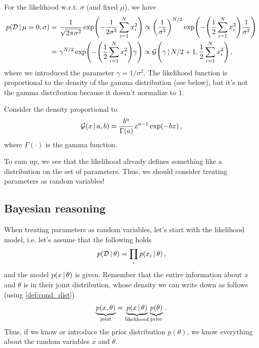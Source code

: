 For the likelihood w.r.t. $\sigma$ (and fixed $\mu$), we have
\begin{align}
    p(\mathcal{D}\cond \mu=0, \sigma) =~& \frac{1}{\sqrt{2\pi\sigma^2}}\exp\left(-\frac{1}{2\sigma^2}\sum_{i=1}^Nx_i^2\right) \propto \left(\frac{1}{\sigma^2}\right)^{N/2}\exp\left(-\left(\frac{1}{2}\sum_{i=1}^Nx_i^2\right)\frac{1}{\sigma^2}\right)\\
    =~& \gamma^{N/2}\exp\left(-\left(\frac{1}{2}\sum_{i=1}^Nx_i^2\right)\gamma\right) \propto \mathcal{G}\left(\gamma\cond N/2+1, \frac{1}{2}\sum_{i=1}^Nx_i^2\right)\,,
\end{align}
where we introduced the parameter $\gamma = 1/\sigma^2$.
The likelihood function is proportional to the density of the gamma distribution (see below), but it's not the gamma distribution because it doesn't normalize to $1$.

\begin{definition}\label{def:gamma_pdf}
    Consider the density proportional to 
    \begin{align}
        \mathcal{G}(x\,|\, a,b) = \frac{b^a}{\Gamma(a)}x^{a-1}\exp(-b x)\,,
    \end{align}
    where $\Gamma(\cdot)$ is the gamma function.
\end{definition}

To sum up, we see that the likelihood already defines something like a distribution on the set of parameters.
Thus, we should consider treating parameters as random variables!

\subsection{Bayesian reasoning}

When treating parameters as random variables, let's start with the likelihood model, i.e. let's assume that the following holds
\begin{align}
    p(\mathcal{D} \,|\, \theta) = \prod_i p(x_i\,|\, \theta)\,,
\end{align}
and the model $p(x\,|\, \theta)$ is given.
Remember that the entire information about $x$ and $\theta$ is in their joint distribution, whose density we can write down as follows (using \cref{def:cond_dist})
\begin{align}
    \underbrace{p(x,\theta)}_{\text{joint}} = \underbrace{p(x\,|\, \theta)}_{\text{likelihood}}\underbrace{p(\theta)}_{\text{prior}}\,.
\end{align}
Thus, if we know or introduce the prior distribution $p(\theta)$, we know everything about the random variables $x$ and $\theta$.

